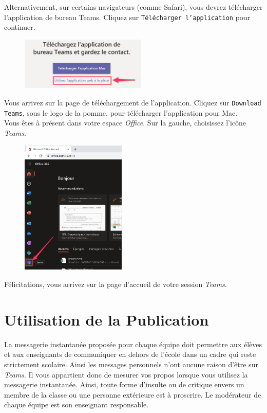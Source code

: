 Alternativement, sur certains navigateurs (comme Safari), vous devrez télécharger l'application de bureau Teams. Cliquez sur \texttt{Télécharger l'application} pour continuer.

\begin{figure}[H]
\includegraphics[width=6cm]{./images/teams/ecran_installer_teams_crop}
\centering
\end{figure}

Vous arrivez sur la page de téléchargement de l'application. Cliquez sur \texttt{Download Teams}, sous le logo de la pomme, pour télécharger l'application pour Mac.\\

Vous êtes à présent dans votre espace \emph{Office}. Sur la gauche, choisissez l'icône \emph{Teams}.

\begin{figure}[H]
\includegraphics[width=5cm]{./images/teams/ecran_accueil_office_crop}
\centering
\end{figure}

Félicitations, vous arrivez sur la page d'accueil de votre session \emph{Teams}.




\section{Utilisation de la Publication}

La messagerie instantanée proposée pour chaque équipe doit permettre aux élèves et aux enseignants de communiquer en dehors de l'école dans un cadre qui reste strictement scolaire. Ainsi les messages personnels n'ont aucune raison d'être sur \emph{Teams}. Il vous appartient donc de mesurer vos propos lorsque vous utilisez la messagerie instantanée. Ainsi, toute forme d'insulte ou de critique envers un membre de la classe ou une personne extérieure est à proscrire. Le modérateur de chaque équipe est son enseignant responsable.\\

